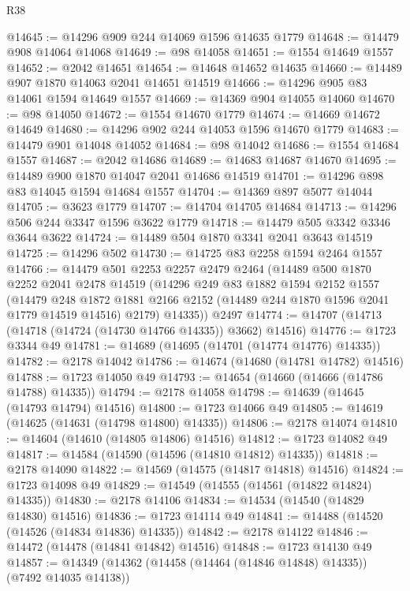 \begin{lexlean}{R38}
\begin{coremodule}
@14645 := @14296 @909 @244 @14069 @1596 @14635 @1779
@14648 := @14479 @908 @14064 @14068
@14649 := @98 @14058
@14651 := @1554 @14649 @1557
@14652 := @2042 @14651
@14654 := @14648 @14652 @14635
@14660 := @14489 @907 @1870 @14063 @2041 @14651 @14519
@14666 := @14296 @905 @83 @14061 @1594 @14649 @1557
@14669 := @14369 @904 @14055 @14060
@14670 := @98 @14050
@14672 := @1554 @14670 @1779
@14674 := @14669 @14672 @14649
@14680 := @14296 @902 @244 @14053 @1596 @14670 @1779
@14683 := @14479 @901 @14048 @14052
@14684 := @98 @14042
@14686 := @1554 @14684 @1557
@14687 := @2042 @14686
@14689 := @14683 @14687 @14670
@14695 := @14489 @900 @1870 @14047 @2041 @14686 @14519
@14701 := @14296 @898 @83 @14045 @1594 @14684 @1557
@14704 := @14369 @897 @5077 @14044
@14705 := @3623 @1779
@14707 := @14704 @14705 @14684
@14713 := @14296 @506 @244 @3347 @1596 @3622 @1779
@14718 := @14479 @505 @3342 @3346 @3644 @3622
@14724 := @14489 @504 @1870 @3341 @2041 @3643 @14519
@14725 := @14296 @502
@14730 := @14725 @83 @2258 @1594 @2464 @1557
@14766 := @14479
    @501
    @2253
    @2257
    @2479
    @2464
    (@14489
      @500
      @1870
      @2252
      @2041
      @2478
      @14519
      (@14296
        @249
        @83
        @1882
        @1594
        @2152
        @1557
        (@14479
          @248
          @1872
          @1881
          @2166
          @2152
          (@14489 @244 @1870 @1596 @2041 @1779 @14519 @14516)
          @2179)
        @14335))
    @2497
@14774 := @14707 (@14713 (@14718 (@14724 (@14730 @14766 @14335)) @3662) @14516)
@14776 := @1723 @3344 @49
@14781 := @14689 (@14695 (@14701 (@14774 @14776) @14335))
@14782 := @2178 @14042
@14786 := @14674 (@14680 (@14781 @14782) @14516)
@14788 := @1723 @14050 @49
@14793 := @14654 (@14660 (@14666 (@14786 @14788) @14335))
@14794 := @2178 @14058
@14798 := @14639 (@14645 (@14793 @14794) @14516)
@14800 := @1723 @14066 @49
@14805 := @14619 (@14625 (@14631 (@14798 @14800) @14335))
@14806 := @2178 @14074
@14810 := @14604 (@14610 (@14805 @14806) @14516)
@14812 := @1723 @14082 @49
@14817 := @14584 (@14590 (@14596 (@14810 @14812) @14335))
@14818 := @2178 @14090
@14822 := @14569 (@14575 (@14817 @14818) @14516)
@14824 := @1723 @14098 @49
@14829 := @14549 (@14555 (@14561 (@14822 @14824) @14335))
@14830 := @2178 @14106
@14834 := @14534 (@14540 (@14829 @14830) @14516)
@14836 := @1723 @14114 @49
@14841 := @14488 (@14520 (@14526 (@14834 @14836) @14335))
@14842 := @2178 @14122
@14846 := @14472 (@14478 (@14841 @14842) @14516)
@14848 := @1723 @14130 @49
@14857 := @14349 (@14362 (@14458 (@14464 (@14846 @14848) @14335)) (@7492 @14035 @14138))

\end{coremodule}
\end{lexlean}
